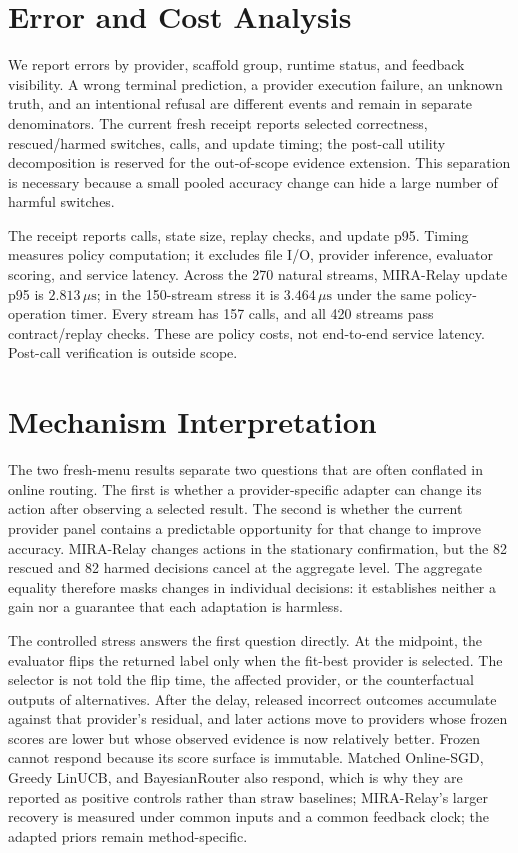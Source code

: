 \documentclass[sigconf,anonymous]{aamas}
\begin{document}
\section{Error and Cost Analysis}
We report errors by provider, scaffold group, runtime status, and feedback visibility. A wrong terminal prediction, a provider execution failure, an unknown truth, and an intentional refusal are different events and remain in separate denominators. The current fresh receipt reports selected correctness, rescued/harmed switches, calls, and update timing; the post-call utility decomposition is reserved for the out-of-scope evidence extension. This separation is necessary because a small pooled accuracy change can hide a large number of harmful switches.

The receipt reports calls, state size, replay checks, and update p95. Timing measures policy computation; it excludes file I/O, provider inference, evaluator scoring, and service latency. Across the 270 natural streams, MIRA-Relay update p95 is $2.813\,\mu\mathrm{s}$; in the 150-stream stress it is $3.464\,\mu\mathrm{s}$ under the same policy-operation timer. Every stream has 157 calls, and all 420 streams pass contract/replay checks. These are policy costs, not end-to-end service latency. Post-call verification is outside scope.

\section{Mechanism Interpretation}
The two fresh-menu results separate two questions that are often conflated in online routing. The first is whether a provider-specific adapter can change its action after observing a selected result. The second is whether the current provider panel contains a predictable opportunity for that change to improve accuracy. MIRA-Relay changes actions in the stationary confirmation, but the 82 rescued and 82 harmed decisions cancel at the aggregate level. The aggregate equality therefore masks changes in individual decisions: it establishes neither a gain nor a guarantee that each adaptation is harmless.

The controlled stress answers the first question directly. At the midpoint, the evaluator flips the returned label only when the fit-best provider is selected. The selector is not told the flip time, the affected provider, or the counterfactual outputs of alternatives. After the delay, released incorrect outcomes accumulate against that provider's residual, and later actions move to providers whose frozen scores are lower but whose observed evidence is now relatively better. Frozen cannot respond because its score surface is immutable. Matched Online-SGD, Greedy LinUCB, and BayesianRouter also respond, which is why they are reported as positive controls rather than straw baselines; MIRA-Relay's larger recovery is measured under common inputs and a common feedback clock; the adapted priors remain method-specific.
\end{document}

